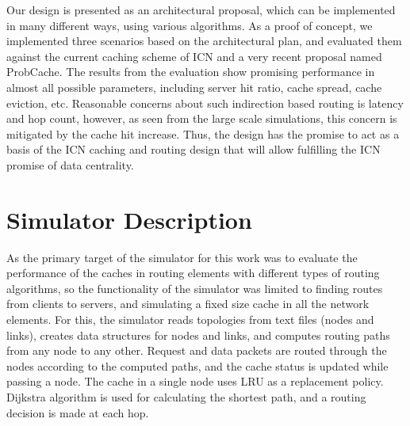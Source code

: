 \documentclass[article]{elsarticle}
\begin{document}
Our design is presented as an architectural proposal, which can be implemented in many different ways, using various algorithms. As a proof of concept, we implemented three scenarios based on the architectural plan, and evaluated them against the current caching scheme of ICN and a very recent proposal named ProbCache. The results from the evaluation show promising performance in almost all possible parameters, including server hit ratio, cache spread, cache eviction, etc. Reasonable concerns about such indirection based routing is latency and hop count, however, as seen from the large scale simulations, this concern is mitigated by the cache hit increase. Thus, the design has the promise to act as a basis of the ICN caching and routing design that will allow fulfilling the ICN promise of data centrality.

\appendix
\section{Simulator Description}
\label{appn:simulator}
As the primary target of the simulator for this work was to evaluate the performance of the caches in routing elements with different types of routing algorithms, so the functionality of the simulator was limited to finding routes from clients to servers, and simulating a fixed size cache in all the network elements. For this, the simulator reads topologies from text files (nodes and links), creates data structures for nodes and links, and computes routing paths from any node to any other. Request and data packets are routed through the nodes according to the computed paths, and the cache status is updated while passing a node. The cache in a single node uses LRU as a replacement policy. Dijkstra algorithm is used for calculating the shortest path, and a routing decision is made at each hop.


 
\end{document}
